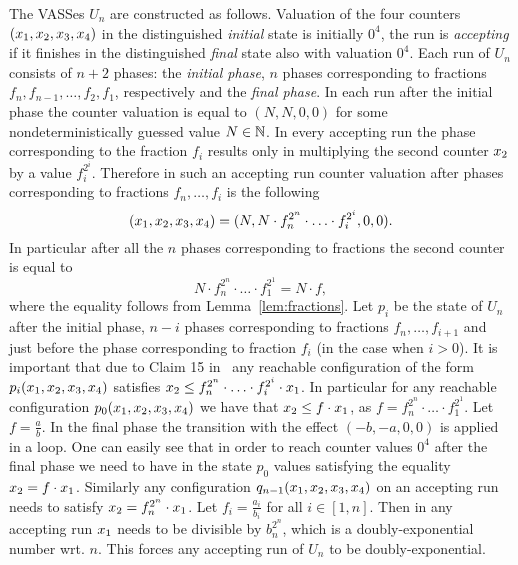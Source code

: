 The VASSes $U_n$ are constructed as follows.
Valuation of the four counters $(x_1, x_2, x_3, x_4)$ in the distinguished \emph{initial} state is initially $0^4$,
the run is \emph{accepting} if it finishes in the distinguished \emph{final} state also with valuation $0^4$.
Each run of $U_n$ consists of $n+2$ phases: the \emph{initial phase},
$n$ phases corresponding to fractions $f_n, f_{n-1}, \ldots, f_2, f_1$, respectively and the \emph{final phase}.
In each run after the initial phase the counter valuation is equal to $(N, N, 0, 0)$ for some nondeterministically guessed value $N \in \mathbb{N}$.
In every accepting run the phase corresponding to the fraction $f_i$ results only in multiplying
the second counter $x_2$ by a value $f_i^{2^i}$. Therefore in such an accepting run
counter valuation after phases corresponding to fractions $f_n, \ldots, f_i$ is the following
\[
(x_1, x_2, x_3, x_4) = (N, N \cdot f_n^{2^n} \cdot \ldots \cdot f_i^{2^i}, 0, 0).
\]
In particular after all the $n$ phases corresponding to fractions the second counter is equal to
\[
N \cdot f_n^{2^n} \cdot \ldots \cdot f_1^{2^1} = N \cdot f,
\]
where the equality follows from Lemma~\ref{lem:fractions}.
Let $p_i$ be the state of $U_n$ after the initial phase, $n-i$ phases corresponding to fractions $f_n, \ldots, f_{i+1}$
and just before the phase corresponding to fraction $f_i$ (in the case when $i > 0$).
It is important that due to Claim 15 in~\cite{DBLP:conf/concur/Czerwinski0LLM20} any reachable configuration
of the form $p_i(x_1, x_2, x_3, x_4)$ satisfies $x_2 \leq f_n^{2^n} \cdot \ldots \cdot f_i^{2^i} \cdot x_1$.
In particular for any reachable configuration $p_0(x_1, x_2, x_3, x_4)$ we have that
$x_2 \leq f \cdot x_1$, as $f = f_n^{2^n} \cdot \ldots \cdot f_1^{2^1}$.
Let $f = \frac{a}{b}$. In the final phase the transition with the effect $(-b, -a, 0, 0)$ is applied in a loop. One can easily see that in order
to reach counter values $0^4$ after the final phase we need to have in the state $p_0$ values satisfying
the equality $x_2 = f \cdot x_1$. Similarly any configuration $q_{n-1}(x_1, x_2, x_3, x_4)$
on an accepting run needs to satisfy $x_2 = f_n^{2^n} \cdot x_1$. Let $f_i = \frac{a_i}{b_i}$ for all $i \in [1,n]$.
Then in any accepting run $x_1$ needs to be divisible by $b_n^{2^n}$, which is a doubly-exponential number wrt. $n$. This forces
any accepting run of $U_n$ to be doubly-exponential.

